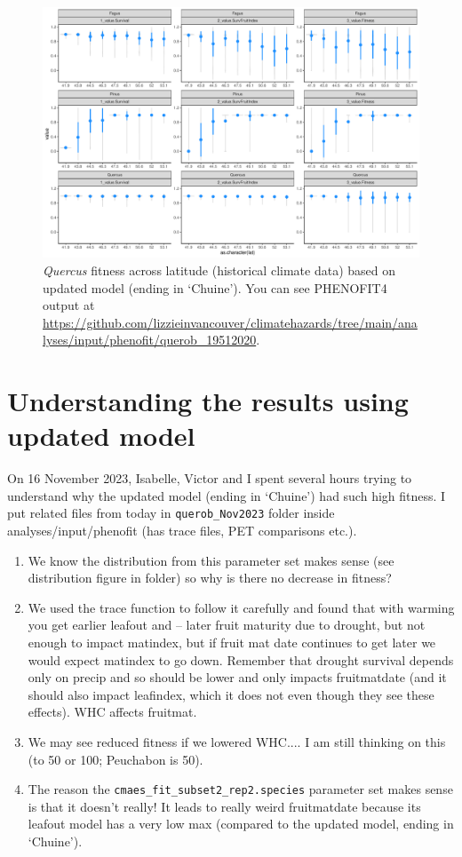 \documentclass[11pt,letter]{article}
\begin{document}
\begin{figure}[h!]
 \begin{center}
\noindent \includegraphics[width=1\textwidth]{..//analyses/graphs/phenofit/historical/fitnessBuildup.pdf}
  \caption{\emph{Quercus} fitness across latitude (historical climate data) based on updated model (ending in `Chuine'). You can see PHENOFIT4 output at \url{https://github.com/lizzieinvancouver/climatehazards/tree/main/analyses/input/phenofit/querob_19512020}.}
  \label{fig:histdnew}
  \end{center}
\end{figure}


\section*{Understanding the results using updated model}

On 16 November 2023, Isabelle, Victor and I spent several hours trying to understand why the updated model (ending in `Chuine') had such high fitness. I put related files from today in \verb|querob_Nov2023| folder inside analyses/input/phenofit (has trace files, PET comparisons etc.). 

\begin{enumerate}
\item We know the distribution from this parameter set makes sense (see distribution figure in folder) so why is there no decrease in fitness?
\item We used the trace function to follow it carefully and found that with warming you get earlier leafout and -- later fruit maturity due to drought, but not enough to impact matindex, but if fruit mat date continues to get later we would expect matindex to go down. Remember that drought survival depends only on precip and so should be lower and only impacts fruitmatdate (and it should also impact leafindex, which it does not even though they see these effects). WHC affects fruitmat.
\item We may see reduced fitness if we lowered WHC.... I am still thinking on this (to 50 or 100; Peuchabon is 50). 
\item The reason the \verb|cmaes_fit_subset2_rep2.species| parameter set makes sense is that it doesn't really! It leads to really weird fruitmatdate because its leafout model has a very low max (compared to the updated model, ending in `Chuine'). 
\end{enumerate}
\end{document}
